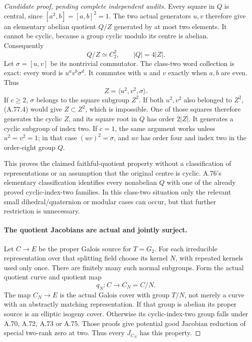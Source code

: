 \begin{proof}[Candidate proof, pending complete independent audits]
Every square in \(Q\) is central, since
\([a^2,b]=[a,b]^2=1\). The two actual generators
\(u,v\) therefore give an elementary abelian quotient
\(Q/Z\) generated by at most two elements. It cannot
be cyclic, because a group cyclic modulo its centre
is abelian. Consequently
\[
                Q/Z\simeq C_2^2,\qquad |Q|=4|Z|.
                                                        \tag{A.77.3}
\]
Let \(\sigma=[u,v]\) be its nontrivial commutator.
The class-two word collection is exact: every word
is \(u^a v^b\sigma^d\). It commutes with \(u\)
and \(v\) exactly when \(a,b\) are even. Thus
\[
                         Z=\langle u^2,v^2,\sigma\rangle.
                                                        \tag{A.77.4}
\]
If \(c\ge2\), \(\sigma\) belongs to the square
subgroup \(Z^2\). If both \(u^2,v^2\) also belonged
to \(Z^2\), (A.77.4) would give \(Z\subset Z^2\),
which is impossible. One of those squares therefore
generates the cyclic \(Z\), and its square root in
\(Q\) has order \(2|Z|\). It generates a cyclic
subgroup of index two. If \(c=1\), the same argument
works unless \(u^2=v^2=1\); in that case
\((uv)^2=\sigma\), and \(uv\) has order four and
index two in the order-eight group \(Q\).

This proves the claimed faithful-quotient property
without a classification of representations or an
assumption that the original centre is cyclic.
A.76's elementary classification identifies every
nonabelian \(Q\) with one of the already proved
cyclic-index-two families. In this class-two situation
only the relevant small dihedral/quaternion or modular
cases can occur, but that further restriction is unnecessary.

\paragraph{The quotient Jacobians are actual and jointly surject.}
Let \(C\to E\) be the proper Galois source for \(T=G_2\).
For each irreducible representation over that splitting field choose its
kernel \(N\), with repeated kernels used only once.
There are finitely many such normal subgroups. Form the
actual quotient curve and quotient map
\[
                    q_N:C\longrightarrow C_N=C/N.
                                                        \tag{A.77.5}
\]
The map \(C_N\to E\) is the actual Galois cover
with group \(T/N\), not merely a curve with an
abstractly matching representation. If that group is
abelian its proper source is an elliptic isogeny cover.
Otherwise its cyclic-index-two group falls under A.70,
A.72, A.73 or A.75. Those proofs give potential good
Jacobian reduction of special two-rank zero at two.
Thus every \(J_{C_N}\) has this property.


\end{proof}
